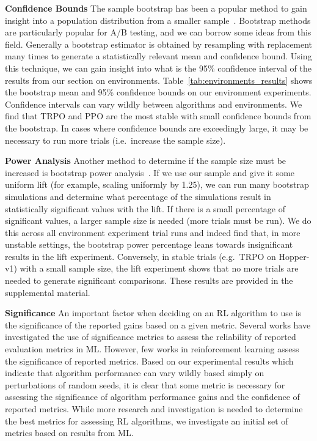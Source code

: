 \documentclass[letterpaper]{article} %
\begin{document}
\textbf{Confidence Bounds} The sample bootstrap has been a popular method to gain insight into a population distribution from a smaller sample~\cite{efron1994introduction}. Bootstrap methods are particularly popular for A/B testing, and we can borrow some ideas from this field. Generally a bootstrap estimator is obtained by resampling with replacement many times to generate a  statistically relevant mean and confidence bound. Using this technique, we can gain insight into what is the 95\% confidence interval of the results from our section on environments. Table~\ref{tab:environments_results} shows the bootstrap mean and 95\% confidence bounds on our environment experiments. Confidence intervals can vary wildly between algorithms and environments. We find that TRPO and PPO are the most stable with small confidence bounds from the bootstrap. In cases where confidence bounds are exceedingly large, it may be necessary to run more trials (i.e.~increase the sample size).

\textbf{Power Analysis} Another method to determine if the sample size must be increased is bootstrap power analysis~\cite{tuffery2011data,yuan2003bootstrap}. If we use our sample and give it some uniform lift (for example, scaling uniformly by 1.25), we can run many bootstrap simulations and determine what percentage of the simulations result in statistically significant values with the lift. If there is a small percentage of significant values, a larger sample size is needed (more trials must be run). We do this across all environment experiment trial runs and indeed find that, in more unstable settings, the bootstrap power percentage leans towards insignificant results in the lift experiment. Conversely, in stable trials (e.g.~TRPO on Hopper-v1) with a small sample size, the lift experiment shows that no more trials are needed to generate significant comparisons. These results are provided in the supplemental material.

\textbf{Significance} An important factor when deciding on an RL algorithm to use is the significance of the reported gains based on a given metric. Several works have investigated the use of significance metrics to assess the reliability of reported evaluation metrics in ML. However, few works in reinforcement learning assess the significance of reported metrics. Based on our experimental results which indicate that algorithm performance can vary wildly based simply on perturbations of random seeds, it is clear that some metric is necessary for assessing the significance of algorithm performance gains and the confidence of reported metrics. While more research and investigation is needed to determine the best metrics for assessing RL algorithms, we investigate an initial set of metrics based on results from ML.
\end{document}
